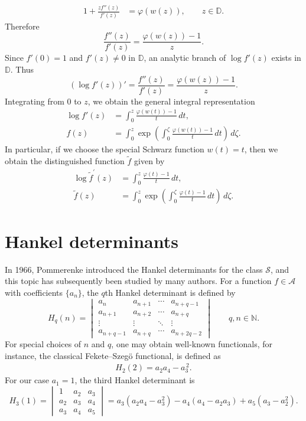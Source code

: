 \documentclass[a4paper,12pt,reqno]{amsart} %
\numberwithin{equation}{section}
\theoremstyle{definition}
\newcounter{own}
\begin{document}
\begin{align}\label{eq:2.3}
1+\frac{z f''(z)}{f'(z)} &= \varphi(w(z)), \qquad z\in \mathbb{D}.
\end{align}
Therefore
\[
\frac{f''(z)}{f'(z)}=\frac{\varphi(w(z))-1}{z}.
\]
Since \(f'(0)=1\) and \(f'(z)\neq 0\) in \(\mathbb{D}\), an analytic branch of \(\log f'(z)\) exists in \(\mathbb{D}\). Thus
\[
(\log f'(z))'=\frac{f''(z)}{f'(z)}=\frac{\varphi(w(z))-1}{z}.
\]
Integrating from \(0\) to \(z\), we obtain the general integral representation
\begin{align}
\log f'(z)&=\int_{0}^{z} \frac{\varphi(w(t))-1}{t}\,dt, \label{eq:2.4}\\
f(z)&=\int_{0}^{z} \exp\!\left(\int_{0}^{\zeta} \frac{\varphi(w(t))-1}{t}\,dt\right)\, d\zeta. \label{eq:2.5}
\end{align}
In particular, if we choose the special Schwarz function \(w(t)=t\), then we obtain the distinguished function \(\widetilde{f}\) given by
\begin{align}
\log \widetilde{f}^\prime(z)&=\int_{0}^{z} \frac{\varphi(t)-1}{t}\,dt, \label{eq:2.6}\\
\widetilde{f}(z)&=\int_{0}^{z} \exp\!\left(\int_{0}^{\zeta} \frac{\varphi(t)-1}{t}\,dt\right)\, d\zeta. \label{eq:2.7}
\end{align}
\section{Hankel determinants}

In 1966, Pommerenke \cite{Pommerenke1966} introduced the Hankel determinants for the class $\mathcal{S}$, and this topic has subsequently been studied by many authors. For a function $f \in \mathcal{A}$ with coefficients $\{a_n\}$, the $q$th Hankel determinant is defined by
\begin{equation}\label{eq:3.1}
H_q(n)=
\begin{vmatrix}
a_n & a_{n+1} & \cdots & a_{n+q-1} \\
a_{n+1} & a_{n+2} & \cdots & a_{n+q} \\
\vdots & \vdots & \ddots & \vdots \\
a_{n+q-1} & a_{n+q} & \cdots & a_{n+2q-2}
\end{vmatrix}
\qquad q,n\in\mathbb N.
\end{equation}
For special choices of $n$ and $q$, one may obtain well-known functionals, for instance, the classical Fekete--Szeg\"o functional, is defined as
\begin{align}\label{eq:3.2}
H_2(2)=a_2 a_4-a_3^{\,2}.
\end{align}
For our case $a_1=1$, the third Hankel determinant is
\begin{equation}\label{eq:3.3}
H_3(1)=
\begin{vmatrix}
1 & a_2 & a_3 \\
a_2 & a_3 & a_4 \\
a_3 & a_4 & a_5
\end{vmatrix}
= a_3(a_2 a_4-a_3^2)-a_4(a_4-a_2 a_3)+a_5(a_3-a_2^2).
\end{equation}
\end{document}
